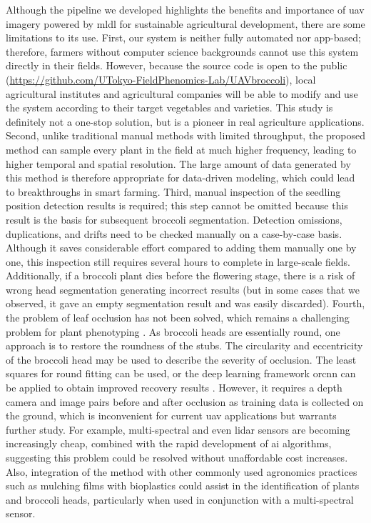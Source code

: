 Although the pipeline we developed highlights the benefits and importance of \gls{uav} imagery powered by \gls{mldl} for sustainable agricultural development, there are some limitations to its use. 
First, our system is neither fully automated nor app-based; therefore, farmers without computer science backgrounds cannot use this system directly in their fields. However, because the source code is open to the public (\url{https://github.com/UTokyo-FieldPhenomics-Lab/UAVbroccoli}), local agricultural institutes and agricultural companies will be able to modify and use the system according to their target vegetables and varieties. This study is definitely not a one-stop solution, but is a pioneer in real agriculture applications. 
Second, unlike traditional manual methods with limited throughput, the proposed method can sample every plant in the field at much higher frequency, leading to higher temporal and spatial resolution. The large amount of data generated by this method is therefore appropriate for data-driven modeling, which could lead to breakthroughs in smart farming.
Third, manual inspection of the seedling position detection results is required; this step cannot be omitted because this result is the basis for subsequent broccoli segmentation. Detection omissions, duplications, and drifts need to be checked manually on a case-by-case basis. Although it saves considerable effort compared to adding them manually one by one, this inspection still requires several hours to complete in large-scale fields. Additionally, if a broccoli plant dies before the flowering stage, there is a risk of wrong head segmentation generating incorrect results (but in some cases that we observed, it gave an empty segmentation result and was easily discarded). 
Fourth, the problem of leaf occlusion has not been solved, which remains a challenging problem for plant phenotyping \citep{zhang_applications_2020}. As broccoli heads are essentially round, one approach is to restore the roundness of the stubs. The circularity and eccentricity of the broccoli head may be used to describe the severity of occlusion. The least squares for round fitting can be used, or the deep learning framework \gls{orcnn} can be applied to obtain improved recovery results \citep{blok_image_2021}. However, it requires a depth camera and image pairs before and after occlusion as training data is collected on the ground, which is inconvenient for current \gls{uav} applications but warrants further study. For example, multi-spectral and even \gls{lidar} sensors are becoming increasingly cheap, combined with the rapid development of \gls{ai} algorithms, suggesting this problem could be resolved without unaffordable cost increases. Also, integration of the method with other commonly used agronomics practices such as mulching films with bioplastics could assist in the identification of plants and broccoli heads, particularly when used in conjunction with a multi-spectral sensor. 
